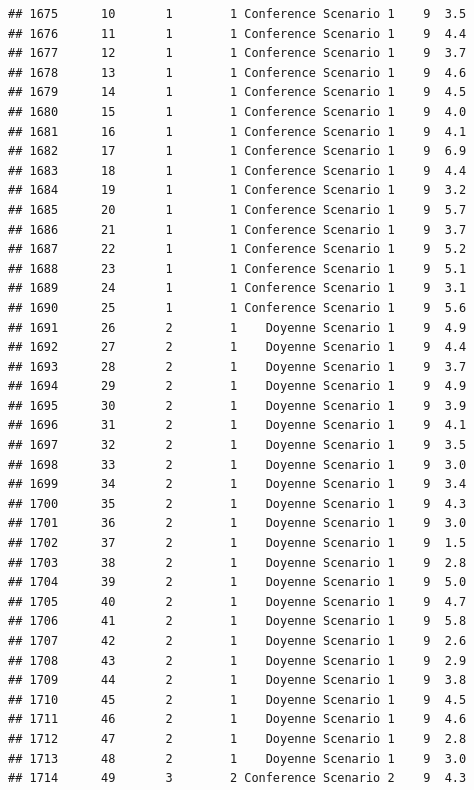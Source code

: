 \documentclass[
]{article}
\begin{document}
\begin{verbatim}
## 1675      10       1        1 Conference Scenario 1    9  3.5
## 1676      11       1        1 Conference Scenario 1    9  4.4
## 1677      12       1        1 Conference Scenario 1    9  3.7
## 1678      13       1        1 Conference Scenario 1    9  4.6
## 1679      14       1        1 Conference Scenario 1    9  4.5
## 1680      15       1        1 Conference Scenario 1    9  4.0
## 1681      16       1        1 Conference Scenario 1    9  4.1
## 1682      17       1        1 Conference Scenario 1    9  6.9
## 1683      18       1        1 Conference Scenario 1    9  4.4
## 1684      19       1        1 Conference Scenario 1    9  3.2
## 1685      20       1        1 Conference Scenario 1    9  5.7
## 1686      21       1        1 Conference Scenario 1    9  3.7
## 1687      22       1        1 Conference Scenario 1    9  5.2
## 1688      23       1        1 Conference Scenario 1    9  5.1
## 1689      24       1        1 Conference Scenario 1    9  3.1
## 1690      25       1        1 Conference Scenario 1    9  5.6
## 1691      26       2        1    Doyenne Scenario 1    9  4.9
## 1692      27       2        1    Doyenne Scenario 1    9  4.4
## 1693      28       2        1    Doyenne Scenario 1    9  3.7
## 1694      29       2        1    Doyenne Scenario 1    9  4.9
## 1695      30       2        1    Doyenne Scenario 1    9  3.9
## 1696      31       2        1    Doyenne Scenario 1    9  4.1
## 1697      32       2        1    Doyenne Scenario 1    9  3.5
## 1698      33       2        1    Doyenne Scenario 1    9  3.0
## 1699      34       2        1    Doyenne Scenario 1    9  3.4
## 1700      35       2        1    Doyenne Scenario 1    9  4.3
## 1701      36       2        1    Doyenne Scenario 1    9  3.0
## 1702      37       2        1    Doyenne Scenario 1    9  1.5
## 1703      38       2        1    Doyenne Scenario 1    9  2.8
## 1704      39       2        1    Doyenne Scenario 1    9  5.0
## 1705      40       2        1    Doyenne Scenario 1    9  4.7
## 1706      41       2        1    Doyenne Scenario 1    9  5.8
## 1707      42       2        1    Doyenne Scenario 1    9  2.6
## 1708      43       2        1    Doyenne Scenario 1    9  2.9
## 1709      44       2        1    Doyenne Scenario 1    9  3.8
## 1710      45       2        1    Doyenne Scenario 1    9  4.5
## 1711      46       2        1    Doyenne Scenario 1    9  4.6
## 1712      47       2        1    Doyenne Scenario 1    9  2.8
## 1713      48       2        1    Doyenne Scenario 1    9  3.0
## 1714      49       3        2 Conference Scenario 2    9  4.3

\end{verbatim}
\end{document}
